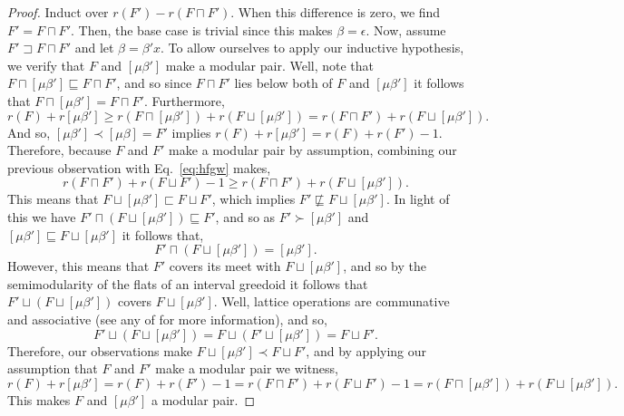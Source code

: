 \documentclass[11pt]{article}
\begin{document}
\begin{proof}
    Induct over $r(F') - r(F\sqcap F')$.
    When this difference is zero, we find $F' = F\sqcap F'$.
    Then, the base case is trivial since this makes $\beta = \epsilon$.
    Now, assume $F' \sqsupset F\sqcap F'$ and let $\beta = \beta' x$.
    To allow ourselves to apply our inductive hypothesis, we verify that $F$ and $[\mu\beta']$ make a modular pair.
    Well, note that $F\sqcap [\mu\beta']\sqsubseteq F\sqcap F'$, and so since $F\sqcap F'$ lies below both of $F$ and $[\mu\beta']$ it follows that $F\sqcap[\mu\beta'] = F\sqcap F'$.
    Furthermore,
    \begin{equation}\label{eq:hfgw}
        r(F) + r[\mu\beta'] \geq r(F\sqcap [\mu\beta']) + r(F\sqcup [\mu\beta']) = r(F\sqcap F') + r(F\sqcup [\mu\beta']).
    \end{equation}
    And so, $[\mu\beta'] \prec [\mu\beta] = F'$ implies $r(F) + r[\mu\beta'] = r(F) + r(F') - 1$.
    Therefore, because $F$ and $F'$ make a modular pair by assumption, combining our previous observation with Eq.~\ref{eq:hfgw} makes,
    \[
        r(F\sqcap F') + r(F\sqcup F') - 1 \geq r(F\sqcap F') + r(F\sqcup [\mu\beta']).
    \]
    This means that $F\sqcup [\mu\beta'] \sqsubset F\sqcup F'$, which implies $F'\not\sqsubseteq F\sqcup [\mu\beta']$.
    In light of this we have $F'\sqcap \left(F\sqcup [\mu\beta']\right) \sqsubseteq F'$, and so as $F'\succ [\mu\beta']$ and $[\mu\beta']\sqsubseteq F\sqcup [\mu\beta']$ it follows that,
    \[
        F'\sqcap \left(F\sqcup [\mu\beta']\right) = [\mu\beta'].
    \]
    However, this means that $F'$ covers its meet with $F\sqcup [\mu\beta']$, and so by the semimodularity of the flats of an interval greedoid it follows that $F'\sqcup\left(F\sqcup [\mu\beta']\right)$ covers $F\sqcup [\mu\beta']$.
    Well, lattice operations are communative and associative (see any of \cite{davey2002introduction, garg2015introduction,gratzer2011lattice} for more information), and so,
    \[
        F'\sqcup\left(F\sqcup [\mu\beta']\right) = F\sqcup\left(F' \sqcup [\mu\beta']\right) = F\sqcup F'.
    \]
    Therefore, our observations make $F\sqcup [\mu\beta'] \prec F\sqcup F'$, and by applying our assumption that $F$ and $F'$ make a modular pair we witness,
    \[
        r(F) + r[\mu\beta'] = r(F) + r(F') - 1 = r(F\sqcap F') + r(F\sqcup F') - 1 = r(F\sqcap [\mu\beta']) + r(F\sqcup [\mu\beta']).
    \]
    This makes $F$ and $[\mu\beta']$ a modular pair.


\end{proof}
\end{document}
